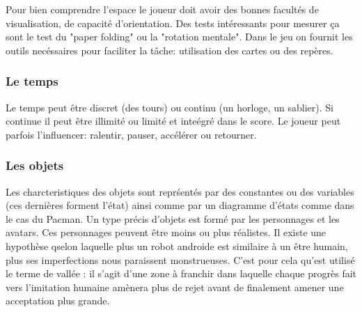 Pour bien comprendre l'espace le joueur doit avoir des bonnes facult\'es de visualisation, de capacit\'e d'orientation. Des tests int\'eressants pour mesurer \c{c}a sont le test du "paper folding" ou la "rotation mentale". Dans le jeu on fournit les outils nec\'essaires pour faciliter la t\^ache: utilisation des cartes ou des rep\`eres.

\subsubsection{Le temps}

Le temps peut \^etre discret (des tours) ou continu (un horloge, un sablier). Si continue il peut \^etre illimit\'e ou limit\'e et inte\'egr\'e dans le score. Le joueur peut parfois l'influencer: ralentir, pauser, acc\'el\'erer ou retourner. 

\subsubsection{Les objets}

Les charcteristiques des objets sont repr\'sent\'es par des constantes ou des variables (ces derni\`eres forment l'\'etat) ainsi comme par un diagramme d'\'etats comme dans le cas du Pacman. Un type pr\'ecis d'objets est form\'e par les personnages et les avatars. Ces personnages peuvent \^etre moins ou plus r\'ealistes. Il existe une hypoth\`ese qselon laquelle plus un robot androide est similaire \`a un \^etre humain, plus ses imperfections nous paraissent monstrueuses. C'est pour cela qu'est utilis\'e le terme de vall\'ee : il s'agit d'une zone \`a franchir dans laquelle chaque progr\`es fait vers l'imitation humaine am\`enera plus de rejet avant de finalement amener une acceptation plus grande.

\begin{figure}[H]
\centering
{}
\end{figure}

